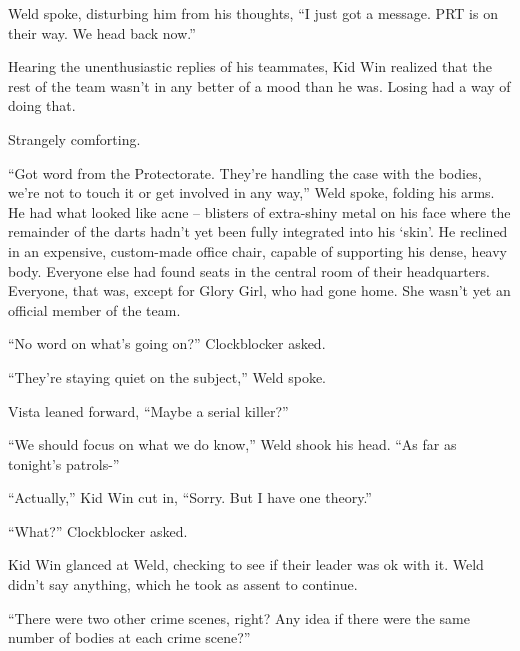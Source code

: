 Weld spoke, disturbing him from his thoughts, ``I just got a message.  PRT is on their way.  We head back now.''



Hearing the unenthusiastic replies of his teammates, Kid Win realized that the rest of the team wasn't in any better of a mood than he was.  Losing had a way of doing that.



Strangely comforting.



\sectionbreak



``Got word from the Protectorate.  They're handling the case with the bodies, we're not to touch it or get involved in any way,'' Weld spoke, folding his arms.  He had what looked like acne – blisters of extra-shiny metal on his face where the remainder of the darts hadn't yet been fully integrated into his `skin'.  He reclined in an expensive, custom-made office chair, capable of supporting his dense, heavy body.  Everyone else had found seats in the central room of their headquarters.  Everyone, that was, except for Glory Girl, who had gone home.  She wasn't yet an official member of the team.



``No word on what's going on?'' Clockblocker asked.



``They're staying quiet on the subject,'' Weld spoke.



Vista leaned forward, ``Maybe a serial killer?''



``We should focus on what we do know,'' Weld shook his head. ``As far as tonight's patrols-''



``Actually,'' Kid Win cut in, ``Sorry.  But I have one theory.''



``What?'' Clockblocker asked.



Kid Win glanced at Weld, checking to see if their leader was ok with it.  Weld didn't say anything, which he took as assent to continue.



``There were two other crime scenes, right?  Any idea if there were the same number of bodies at each crime scene?''




